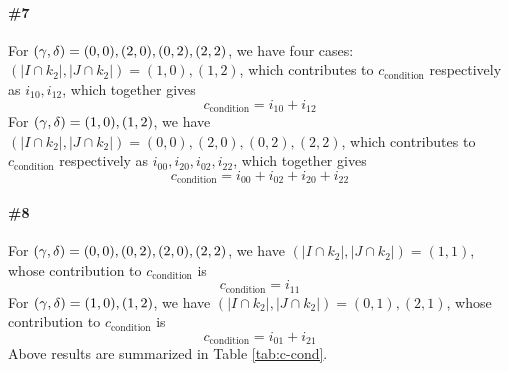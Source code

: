 \documentclass[11pt]{article}
\renewcommand{\>}{\rangle}
\newcommand{\<}{\langle}
\begin{document}
\paragraph{\#7} For $(\gamma,\delta)=(0,0),(2,0),(0,2),(2,2)$, we have four cases:
$(|I\cap k_{2}|,|J\cap k_{2}|)=(1,0),(1,2)$, which contributes to
$c_{\text{condition}}$ respectively as $i_{10},i_{12}$, which together
gives
\begin{equation}
c_{\text{condition}}=i_{10}+i_{12}
\end{equation}
For $(\gamma,\delta)=(1,0),(1,2)$, we have $(|I\cap k_{2}|,|J\cap k_{2}|)=(0,0),(2,0),(0,2),(2,2)$,
which contributes to $c_{\text{condition}}$ respectively as $i_{00},i_{20},i_{02},i_{22}$,
which together gives
\begin{equation}
c_{\text{condition}}=i_{00}+i_{02}+i_{20}+i_{22}
\end{equation}
\paragraph{\#8} For $(\gamma,\delta)=(0,0),(0,2),(2,0),(2,2)$, we have $(|I\cap k_{2}|,|J\cap k_{2}|)=(1,1)$,
whose contribution to $c_{\text{condition}}$ is
\begin{equation}
c_{\text{condition}}=i_{11}
\end{equation}
For $(\gamma,\delta)=(1,0),(1,2)$, we have $(|I\cap k_{2}|,|J\cap k_{2}|)=(0,1),(2,1)$,
whose contribution to $c_{\text{condition}}$ is
\begin{equation}
c_{\text{condition}}=i_{01}+i_{21}
\end{equation}
Above results are summarized in Table \ref{tab:c-cond}.
\end{document}
